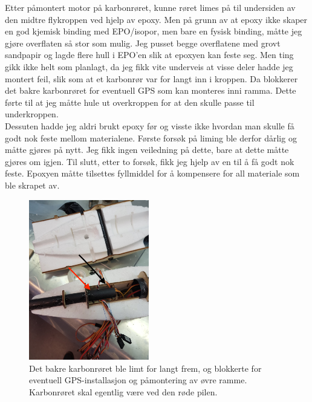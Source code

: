 \documentclass[12pt, a4paper]{article}
\begin{document}
\newpage
Etter påmontert motor på karbonrøret, kunne røret limes på til undersiden av den midtre flykroppen ved hjelp av epoxy. Men på grunn av at epoxy ikke skaper en god kjemisk binding med EPO/isopor, men bare en fysisk binding, måtte jeg gjøre overflaten så stor som mulig. Jeg pusset begge overflatene med grovt sandpapir og lagde flere hull i EPO'en slik at epoxyen kan feste seg. 
Men ting gikk ikke helt som planlagt, da jeg fikk vite underveis at visse deler hadde jeg montert feil, slik som at et karbonrør var for langt inn i kroppen. Da blokkerer det bakre karbonrøret for eventuell GPS som kan monteres inni ramma. Dette førte til at jeg måtte hule ut overkroppen for at den skulle passe til underkroppen. \\
Dessuten hadde jeg aldri brukt epoxy før og visste ikke hvordan man skulle få godt nok feste mellom materialene. Første forsøk på liming ble derfor dårlig og måtte gjøres på nytt. Jeg fikk ingen veiledning på dette, bare at dette måtte gjøres om igjen. Til slutt, etter to forsøk, fikk jeg hjelp av en til å få godt nok feste. Epoxyen måtte tilsettes fyllmiddel for å kompensere for all materiale som ble skrapet av. \\


\begin{figure}[ht]
	\centering
	\includegraphics[height = 7cm, width = .6\textwidth]{bilder/feilmontering_av_karbon_red.jpg}
	\caption[Feilliming]{Det bakre karbonrøret ble limt for langt frem, og blokkerte for eventuell GPS-installasjon og påmontering av øvre ramme. Karbonrøret skal egentlig være ved den røde pilen.}
\end{figure}
\end{document}

